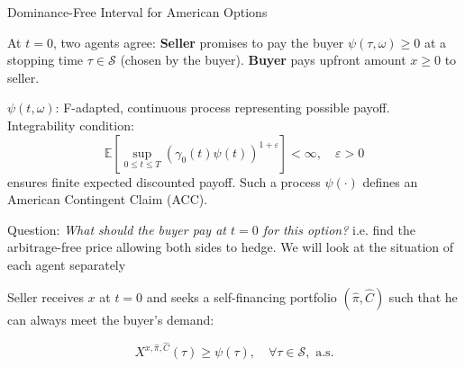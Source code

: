 \documentclass{beamer}
\begin{document}
\begin{frame}{Dominance-Free Interval for American Options}

    {\footnotesize \footnotesize
   \par At \( t = 0 \), two agents agree: \textbf{Seller} promises to pay the buyer \(\psi(\tau, \omega) \geq 0\)
     at a stopping time \(\tau \in \mathcal{S}\) (chosen by the buyer). 
     \textbf{Buyer} pays upfront amount \(x \geq 0\) to seller.
     \vspace{1em}
    \par \(\psi(t, \omega)\): F-adapted, continuous process representing possible payoff. Integrability condition:
    \[
    \mathbb{E} \left[ \sup_{0 \leq t \leq T} \left( \gamma_0(t) \psi(t) \right)^{1 + \varepsilon} \right] < \infty, \quad \varepsilon > 0
    \]
    ensures finite expected discounted payoff. Such a process \(\psi(\cdot)\) defines an American Contingent Claim (ACC).
    \vspace{1em}
    \par \pause  Question: \textit{What should the buyer pay at \(t = 0\) for this option?}  
    i.e. find the arbitrage-free price allowing both sides to hedge. We will look at the situation of each agent
    separately
    \vspace{1em}
    \par Seller receives \(x\) at \(t = 0\) and seeks a self-financing portfolio \((\hat{\pi}, \hat{C})\) such that he can always meet the buyer's demand:

\[
X^{x,\hat{\pi},\hat{C}}(\tau) \geq \psi(\tau), \quad \forall \tau \in \mathcal{S}, \text{ a.s.}
\]
    }
\end{frame} 
\end{document}
